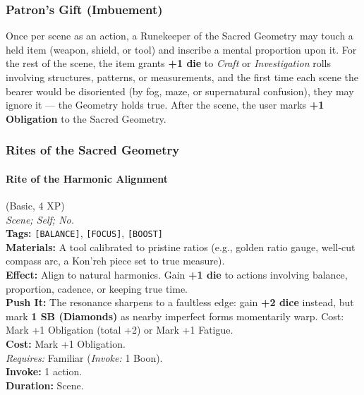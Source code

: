 \subsubsection*{Patron's Gift (Imbuement)}

Once per scene as an action, a Runekeeper of the Sacred Geometry may touch a held item (weapon, shield, or tool) and inscribe a mental proportion upon it. For the rest of the scene, the item grants \textbf{+1 die} to \textit{Craft} or \textit{Investigation} rolls involving structures, patterns, or measurements, and the first time each scene the bearer would be disoriented (by fog, maze, or supernatural confusion), they may ignore it --- the Geometry holds true. After the scene, the user marks \textbf{+1 Obligation} to the Sacred Geometry.

\subsubsection*{Rites of the Sacred Geometry}

\paragraph{Rite of the Harmonic Alignment} (Basic, 4 XP) \hfill \\
\emph{Scene; Self; No.} \\
\textbf{Tags:} \texttt{[BALANCE]}, \texttt{[FOCUS]}, \texttt{[BOOST]} \\
\textbf{Materials:} A tool calibrated to pristine ratios (e.g., golden ratio gauge, well-cut compass arc, a Kon'reh piece set to true measure). \\
\textbf{Effect:} Align to natural harmonics. Gain \textbf{+1 die} to actions involving balance, proportion, cadence, or keeping true time. \\
\textbf{Push It:} The resonance sharpens to a faultless edge: gain \textbf{+2 dice} instead, but mark \textbf{1 SB (Diamonds)} as nearby imperfect forms momentarily warp. Cost: Mark +1 Obligation (total +2) or Mark +1 Fatigue. \\
\textbf{Cost:} Mark +1 Obligation. \\
\textit{Requires:} Familiar (\textit{Invoke:} 1 Boon). \\
\textbf{Invoke:} 1 action. \\
\textbf{Duration:} Scene.

